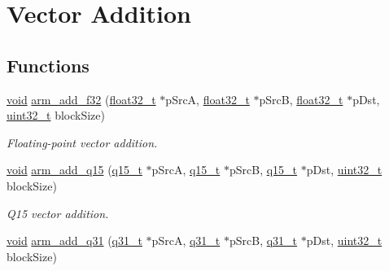 \hypertarget{group___basic_add}{\section{Vector Addition}
\label{group___basic_add}
}
\subsection*{Functions}
\begin{DoxyCompactItemize}
\item 
\hyperlink{group___n_a_m_e_ga18028b8badbf1ea7e704ccac3c488e82}{void} \hyperlink{group___basic_add_ga6a904a547413b10565dd1d251c6bafbd}{arm\-\_\-add\-\_\-f32} (\hyperlink{arm__math_8h_a4611b605e45ab401f02cab15c5e38715}{float32\-\_\-t} $\ast$p\-Src\-A, \hyperlink{arm__math_8h_a4611b605e45ab401f02cab15c5e38715}{float32\-\_\-t} $\ast$p\-Src\-B, \hyperlink{arm__math_8h_a4611b605e45ab401f02cab15c5e38715}{float32\-\_\-t} $\ast$p\-Dst, \hyperlink{stdint_8h_a435d1572bf3f880d55459d9805097f62}{uint32\-\_\-t} block\-Size)
\begin{DoxyCompactList}\small\item\em Floating-\/point vector addition. \end{DoxyCompactList}\item 
\hyperlink{group___n_a_m_e_ga18028b8badbf1ea7e704ccac3c488e82}{void} \hyperlink{group___basic_add_gabb51285a41f511670bbff62fc0e1bf62}{arm\-\_\-add\-\_\-q15} (\hyperlink{arm__math_8h_ab5a8fb21a5b3b983d5f54f31614052ea}{q15\-\_\-t} $\ast$p\-Src\-A, \hyperlink{arm__math_8h_ab5a8fb21a5b3b983d5f54f31614052ea}{q15\-\_\-t} $\ast$p\-Src\-B, \hyperlink{arm__math_8h_ab5a8fb21a5b3b983d5f54f31614052ea}{q15\-\_\-t} $\ast$p\-Dst, \hyperlink{stdint_8h_a435d1572bf3f880d55459d9805097f62}{uint32\-\_\-t} block\-Size)
\begin{DoxyCompactList}\small\item\em Q15 vector addition. \end{DoxyCompactList}\item 
\hyperlink{group___n_a_m_e_ga18028b8badbf1ea7e704ccac3c488e82}{void} \hyperlink{group___basic_add_ga24d6c3f7f8b9fae4847c0c3f26a39a3b}{arm\-\_\-add\-\_\-q31} (\hyperlink{arm__math_8h_adc89a3547f5324b7b3b95adec3806bc0}{q31\-\_\-t} $\ast$p\-Src\-A, \hyperlink{arm__math_8h_adc89a3547f5324b7b3b95adec3806bc0}{q31\-\_\-t} $\ast$p\-Src\-B, \hyperlink{arm__math_8h_adc89a3547f5324b7b3b95adec3806bc0}{q31\-\_\-t} $\ast$p\-Dst, \hyperlink{stdint_8h_a435d1572bf3f880d55459d9805097f62}{uint32\-\_\-t} block\-Size)

\end{DoxyCompactItemize}
